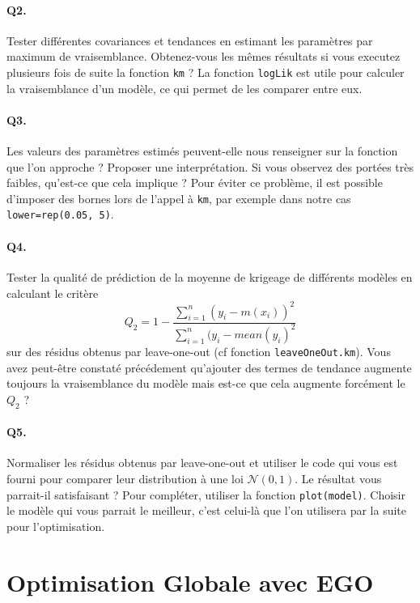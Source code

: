 \documentclass[12pt]{scrartcl}
\begin{document}
\paragraph{Q2.} Tester différentes covariances et tendances en estimant les paramètres par maximum de vraisemblance. Obtenez-vous les mêmes résultats si vous executez plusieurs fois de suite la fonction \texttt{km} ? La fonction \texttt{logLik} est utile pour calculer la vraisemblance d'un modèle, ce qui permet de les comparer entre eux.

\paragraph{Q3. } Les valeurs des paramètres estimés peuvent-elle nous renseigner sur la fonction que l'on approche ? Proposer une interprétation. 
Si vous observez des portées très faibles, qu'est-ce que cela implique ? Pour éviter ce problème, il est possible d'imposer des bornes lors de l'appel à \texttt{km}, par exemple dans notre cas \texttt{lower=rep(0.05, 5)}.

\paragraph{Q4. } Tester la qualité de prédiction de la moyenne de krigeage de différents modèles en calculant le critère 
$$Q_2 = 1 - \frac{\sum_{i=1}^n (y_i - m(x_i))^2}{\sum_{i=1}^n (y_i - mean(y_i)^2}$$
sur des résidus obtenus par leave-one-out (cf fonction \texttt{leaveOneOut.km}). Vous avez peut-être constaté précédement qu'ajouter des termes de tendance augmente toujours la vraisemblance du modèle mais est-ce que cela augmente forcément le $Q_2$ ? 

\paragraph{Q5. } Normaliser les résidus obtenus par leave-one-out et utiliser le code qui vous est fourni pour comparer leur distribution à une loi $\mathcal{N}(0, 1)$. 
Le résultat vous parrait-il satisfaisant ? Pour compléter, utiliser la fonction \texttt{plot(model)}. Choisir le modèle qui vous parrait le meilleur, c'est celui-là que l'on utilisera par la suite pour l'optimisation.

\section{Optimisation Globale avec EGO}
\end{document}
